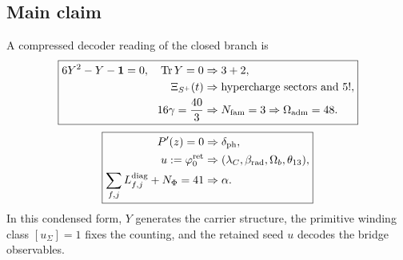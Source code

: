 \subsection{Main claim}

A compressed decoder reading of the closed branch is
\[
\boxed{
\begin{aligned}
6Y^2-Y-\mathbf 1=0,\quad \operatorname{Tr} Y=0
&\Rightarrow 3+2,\\
\Xi_{S^+}(t)
&\Rightarrow \text{hypercharge sectors and }5!,\\
16\gamma=\frac{40}{3}
&\Rightarrow N_{\mathrm{fam}}=3\Rightarrow \Omega_{\mathrm{adm}}=48.
\end{aligned}}
\]
\[
\boxed{
\begin{aligned}
P'(z)=0
&\Rightarrow \delta_{\mathrm{ph}},\\
u:=\varphi_0^{\mathrm{ret}}
&\Rightarrow (\lambda_C,\beta_{\mathrm{rad}},\Omega_b,\theta_{13}),\\
\sum_{f,j}L_{f,j}^{\mathrm{diag}}+N_\Phi=41
&\Rightarrow \alpha.
\end{aligned}}
\]
In this condensed form, $Y$ generates the carrier structure, the primitive winding class
$[u_\Sigma]=1$ fixes the counting, and the retained seed $u$ decodes the bridge observables.

